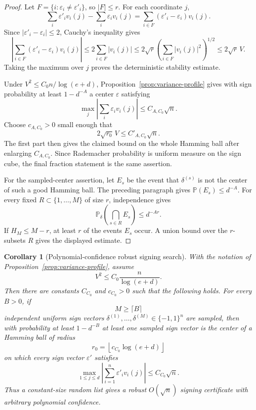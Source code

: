 \documentclass[11pt]{amsart}
\numberwithin{equation}{section}
\newtheorem{corollary}[theorem]{Corollary}
\theoremstyle{definition}
\theoremstyle{remark}
\newcommand{\Prob}{\mathbb P}
\newcommand{\eps}{\varepsilon}
\begin{document}
\begin{proof}
Let \(F=\{i:\eps_i\ne\eps'_i\}\), so \(|F|\le r\).  For each coordinate \(j\),
\[
  \sum_i\eps'_iv_i(j)-\sum_i\eps_iv_i(j)
  =\sum_{i\in F}(\eps'_i-\eps_i)v_i(j).
\]
Since \(|\eps'_i-\eps_i|\le2\), Cauchy's inequality gives
\[
  \left|\sum_{i\in F}(\eps'_i-\eps_i)v_i(j)\right|
  \le 2\sum_{i\in F}|v_i(j)|
  \le 2\sqrt r\left(\sum_{i\in F}|v_i(j)|^2\right)^{1/2}
  \le 2\sqrt r\,V.
\]
Taking the maximum over \(j\) proves the deterministic stability estimate.

Under \(V^2\le C_0n/\log(e+d)\), Proposition~\ref{prop:variance-profile} gives
with sign probability at least \(1-d^{-A}\) a center \(\eps\) satisfying
\[
  \max_j\left|\sum_i\eps_i v_i(j)\right|\le C_{A,C_0}\sqrt n .
\]
Choose \(c_{A,C_0}>0\) small enough that
\[
  2\sqrt{r_0}\,V\le C'_{A,C_0}\sqrt n .
\]
The first part then gives the claimed bound on the whole Hamming ball after
enlarging \(C_{A,C_0}\).  Since Rademacher probability is uniform measure on the
sign cube, the final fraction statement is the same assertion.

For the sampled-center assertion, let \(E_s\) be the event that
\(\delta^{(s)}\) is not the center of such a good Hamming ball.  The preceding
paragraph gives \(\Prob(E_s)\le d^{-A}\).  For every fixed
\(R\subset\{1,\ldots,M\}\) of size \(r\), independence gives
\[
  \Prob_\delta\left(\bigcap_{s\in R}E_s\right)\le d^{-Ar}.
\]
If \(H_M\le M-r\), at least \(r\) of the events \(E_s\) occur.  A union bound
over the \(r\)-subsets \(R\) gives the displayed estimate.
\end{proof}

\begin{corollary}[Polynomial-confidence robust signing search]
\label{cor:edge-profile-poly-confidence}
With the notation of Proposition~\ref{prop:variance-profile}, assume
\[
  V^2\le C_0\frac n{\log(e+d)} .
\]
Then there are constants \(C_{C_0}\) and \(c_{C_0}>0\) such that the following
holds.  For every \(B>0\), if
\[
  M\ge \lceil B\rceil
\]
independent uniform sign vectors
\(\delta^{(1)},\ldots,\delta^{(M)}\in\{-1,1\}^n\) are sampled, then with
probability at least \(1-d^{-B}\) at least one sampled sign vector is the center
of a Hamming ball of radius
\[
  r_0=\left\lfloor c_{C_0}\log(e+d)\right\rfloor
\]
on which every sign vector \(\eps'\) satisfies
\[
  \max_{1\le j\le d}\left|\sum_{i=1}^n\eps'_i v_i(j)\right|
  \le C_{C_0}\sqrt n .
\]
Thus a constant-size random list gives a robust \(O(\sqrt n)\) signing
certificate with arbitrary polynomial confidence.
\end{corollary}
\end{document}
